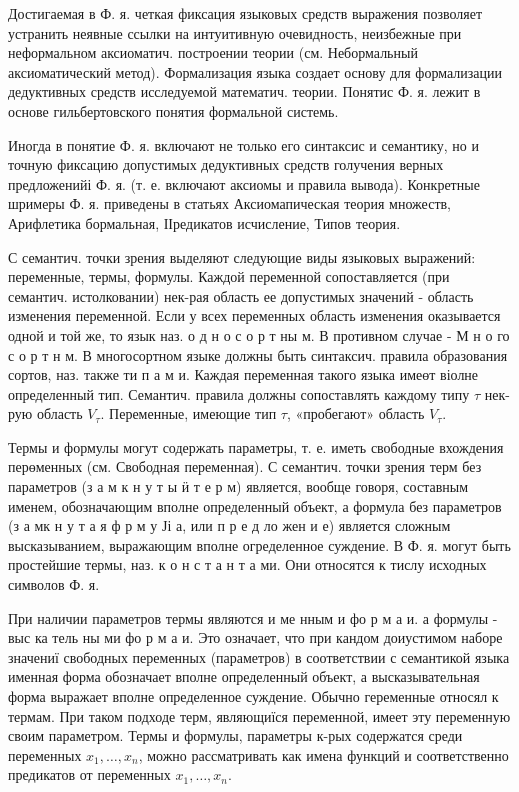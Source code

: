 \documentclass[10pt]{article}
\begin{document}
Достигаемая в Ф. я. четкая фиксация языковых средств выражения позволяет устранить неявные ссылки на интуитивную очевидность, неизбежные при неформальном аксиоматич. построении теории (см. Небормальный аксиоматический метод). Формализация языка создает основу для формализации дедуктивных средств исследуемой математич. теории. Понятис Ф. я. лежит в основе гильбертовского понятия формальной системь.



Иногда в понятие Ф. я. включают не только его синтаксис и семантику, но и точную фиксацию допустимых дедуктивных средств голучения верных предложенийі Ф. я. (т. е. включают аксиомы и правила вывода). Конкретные шримеры Ф. я. приведены в статьях Аксиомапическая теория множеств, Арифлетика бормальная, ІІредикатов исчисление, Типов теория.



С семантич. точки зрения выделяют следующие виды языковых выражений: переменные, термы, формулы. Каждой переменной сопоставляется (при семантич. истолковании) нек-рая область ее допустимых значений - область изменения переменной. Если у всех переменных область изменения оказывается одной и той же, то язык наз. о д н о с о р т ны м. В противном случае - М н о го с о р т н м. В многосортном языке должны быть синтаксич. правила образования сортов, наз. также ти п а м и. Каждая переменная такого языка имеөт віолне определенный тип. Семантич. правила должны сопоставлять каждому типу $\tau$ нек-рую область $V_{\tau}$. Переменные, имеющие тип $\tau$, «пробегают» область $V_{\tau}$.



Термы и формулы могут содержать параметры, т. е. иметь свободные вхождения перөменных (см. Свободная переменная). С семантич. точки зрения терм без параметров (з а м к н у т ы ӥ т е р м) является, вообще говоря, составным именем, обозначающим вполне определенный объект, а формула без параметров (з а мк н у т а я ф р м у Јі а, или п р е д ло жен и е) является сложным высказыванием, выражающим вполне огределенное суждение. В Ф. я. могут быть простейшие термы, наз. к о н с т а н т а ми. Они относятся к тислу исходных символов Ф. я.



При наличии параметров термы являются и ме нным и фо р м а и. а формулы - выс ка тель ны ми фо р м а и. Это означает, что при кандом доиустимом наборе значениї свободных переменных (параметров) в соответствии с семантикой языка именная форма обозначает вполне определенный объект, а высказывательная форма выражает вполне определенное суждение. Обычно геременные относял к термам. При таком подходе терм, являющиїся переменной, имеет эту переменную своим параметром. Термы и формулы, параметры к-рых содержатся среди переменных $x_{1}, \ldots, x_{n}$, можно рассматривать как имена функций и соответственно предикатов от переменных $x_{1}, \ldots, x_{n}$.
\end{document}
